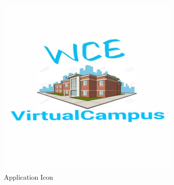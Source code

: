 \documentclass{article}
\begin{document}
\iffalse
\begin{figure}[h]
  \begin{subfigure}[b]{0.4\textwidth}
    \includegraphics[width=.9\linewidth]{Icon.png}
  	\caption{Application Icon}
    \label{fig:1}
  \end{subfigure}
  \begin{subfigure}[b]{0.4\textwidth}

\end{subfigure}
\end{figure}
\end{document}
